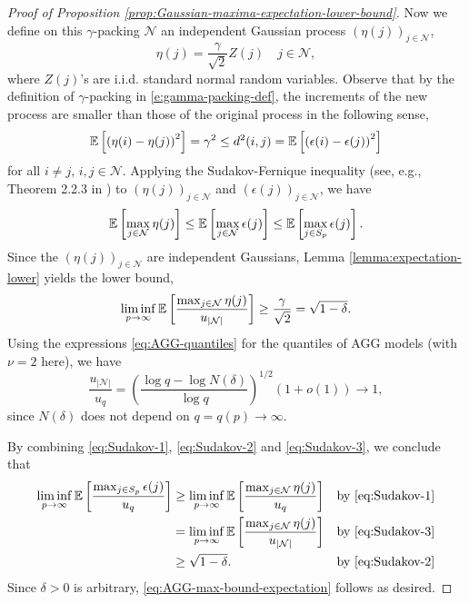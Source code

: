 \begin{proof}[Proof of Proposition \ref{prop:Gaussian-maxima-expectation-lower-bound}]
Now we define on this $\gamma$-packing $\mathcal{N}$ an independent Gaussian process $\left(\eta(j)\right)_{j\in\mathcal{N}}$, 
$$\eta(j) = \frac{\gamma}{\sqrt{2}}Z(j) \quad j\in \mathcal{N},$$
where $Z(j)$'s are i.i.d. standard normal random variables.
Observe that by the definition of $\gamma$-packing in \eqref{e:gamma-packing-def}, the increments of the new process are smaller than those of the original process in the following sense, 
$$
{\mathbb E}\left[\left(\eta(i)-\eta(j)\right)^2\right] = \gamma^2 \le d^2(i,j) = {\mathbb E}\left[\left(\epsilon(i)-\epsilon(j)\right)^2\right]
$$
for all $i\neq j$, $i,j\in\mathcal{N}$. Applying the Sudakov-Fernique inequality (see, e.g., Theorem 2.2.3 in \citep{adler2009random}) to  $\left(\eta(j)\right)_{j\in\mathcal{N}}$ and  $\left(\epsilon(j)\right)_{j\in\mathcal{N}}$, we have
\begin{equation}\label{eq:Sudakov-1}
\E\left[\max_{j\in\mathcal{N}}\eta(j)\right] \le \E\left[\max_{j\in\mathcal{N}}\epsilon(j)\right] \le \E\left[\max_{j\in{S_p}}\epsilon(j)\right].
\end{equation}
Since the $\left(\eta(j)\right)_{j\in\mathcal{N}}$ are independent Gaussians, Lemma \ref{lemma:expectation-lower} yields the lower bound,
\begin{equation}\label{eq:Sudakov-2}
\liminf_{p\to\infty} \E\left[\frac{\max_{j\in\mathcal{N}}\eta(j)}{u_{|\mathcal{N}|}}\right] \ge \frac{\gamma}{\sqrt{2}} = \sqrt{1-\delta}.
\end{equation}
Using the expressions \eqref{eq:AGG-quantiles} for the quantiles 
of AGG models (with $\nu=2$ here), we have
\begin{equation}\label{eq:Sudakov-3}
\frac{u_{|\mathcal{N}|}}{u_q} 
= \left(\frac{\log q-\log{N(\delta)}}{\log{q}}\right)^{1/2}\left(1+o(1)\right)\to 1,
\end{equation}
since $N(\delta)$ does not depend on $q= q(p)\to \infty$.

By combining \eqref{eq:Sudakov-1}, \eqref{eq:Sudakov-2} and \eqref{eq:Sudakov-3}, we conclude that
\begin{align*}
    \liminf_{p\to\infty} \E\left[\frac{\max_{j\in{S_p}}\epsilon(j)}{u_q}\right] 
    &\ge \liminf_{p\to\infty} \E\left[\frac{\max_{j\in\mathcal{N}}\eta(j)}{u_q}\right] &\text{by } \eqref{eq:Sudakov-1}\\
    &= \liminf_{p\to\infty} \E\left[\frac{\max_{j\in\mathcal{N}}\eta(j)}{u_{|\mathcal{N}|}}\right]  &\text{by } \eqref{eq:Sudakov-3} \\
    &\ge \sqrt{1-\delta}.  &\text{by } \eqref{eq:Sudakov-2}
\end{align*} 
Since $\delta>0$ is arbitrary, \eqref{eq:AGG-max-bound-expectation} follows as desired.
\end{proof}

